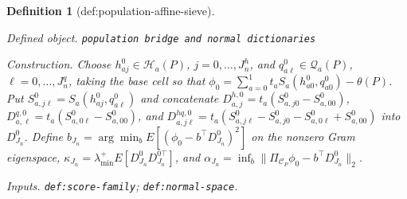\documentclass{article}
\newtheorem{definition}{Definition}
\begin{document}
\begin{definition}[def:population-affine-sieve]\label{def:population-affine-sieve}
\par\smallskip\noindent\emph{Defined object.} \texttt{population bridge and normal dictionaries}
\par\smallskip\noindent\emph{Construction.} Choose \(h^0_{aj}\in\mathcal H_a(P)\), \(j=0,\ldots,J_n^h\), and \(q^0_{a\ell}\in\mathcal Q_a(P)\), \(\ell=0,\ldots,J_n^q\), taking the base cell so that \(\phi_0=\sum_{a=0}^1t_aS_a(h^0_{a0},q^0_{a0})-\theta(P)\). Put \(S^0_{a,j\ell}=S_a(h^0_{aj},q^0_{a\ell})\) and concatenate \(D^{h,0}_{a,j}=t_a(S^0_{a,j0}-S^0_{a,00})\), \(D^{q,0}_{a,\ell}=t_a(S^0_{a,0\ell}-S^0_{a,00})\), and \(D^{hq,0}_{a,j\ell}=t_a(S^0_{a,j\ell}-S^0_{a,j0}-S^0_{a,0\ell}+S^0_{a,00})\) into \(D^0_{J_n}\). Define \(b_{J_n}=\arg\min_bE[(\phi_0-b^\top D^0_{J_n})^2]\) on the nonzero Gram eigenspace, \(\kappa_{J_n}=\lambda_{\min}^{+}E[D^0_{J_n}D_{J_n}^{0\top}]\), and \(\alpha_{J_n}=\inf_b\|\Pi_{\mathcal C_P}\phi_0-b^\top D^0_{J_n}\|_2\).
\par\smallskip\noindent\emph{Inputs.} \texttt{def:\allowbreak{}score-\allowbreak{}family}; \texttt{def:\allowbreak{}normal-\allowbreak{}space}.
\end{definition}
\end{document}
